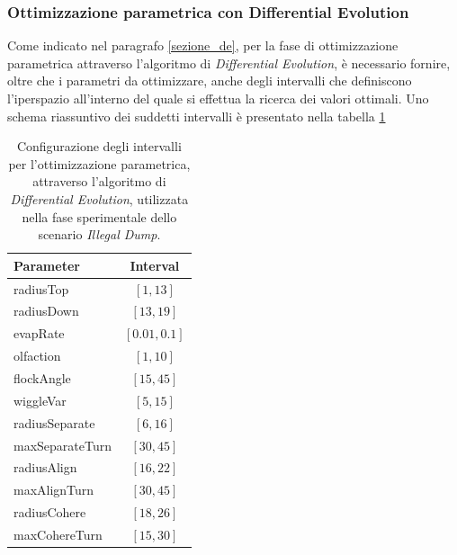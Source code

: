 \subsubsection{Ottimizzazione parametrica con Differential Evolution}

Come indicato nel paragrafo \ref{sezione_de}, per la fase di ottimizzazione parametrica attraverso l'algoritmo di \textit{Differential Evolution}, è necessario fornire, oltre che i parametri da ottimizzare, anche degli intervalli che definiscono l'iperspazio all'interno del quale si effettua la ricerca dei valori ottimali.
Uno schema riassuntivo dei suddetti intervalli è presentato nella tabella \ref{tabella_intervalli_dump}

\begin{table}[H]
    \centering
    \captionsetup{justification=centering, margin=2cm, font=footnotesize}
    \begin{tabular}{|l|c|}
    \hline
    \textbf{Parameter}              & \textbf{Interval}                 \\ \hline
    radiusTop                       & $[1,13]$                          \\ \hline
    radiusDown                      & $[13,19]$                         \\ \hline
    evapRate                        & $[0.01,0.1]$                      \\ \hline
    olfaction                       & $[1,10]$                          \\ \hline
    flockAngle                      & $[15,45]$                         \\ \hline
    wiggleVar                       & $[5,15]$                          \\ \hline
    radiusSeparate                  & $[6,16]$                          \\ \hline
    maxSeparateTurn                 & $[30,45]$                         \\ \hline
    radiusAlign                     & $[16,22]$                         \\ \hline
    maxAlignTurn                    & $[30,45]$                         \\ \hline
    radiusCohere                    & $[18,26]$                         \\ \hline
maxCohereTurn                       & $[15,30]$                         \\ \hline
    \end{tabular}%
    
    \caption{Configurazione degli intervalli per l'ottimizzazione parametrica, attraverso l'algoritmo di \textit{Differential Evolution}, utilizzata nella fase sperimentale dello scenario \textit{Illegal Dump}.}
    \label{tabella_intervalli_dump}
\end{table}


